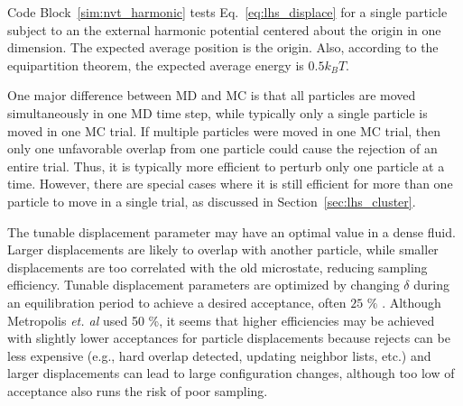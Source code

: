 \documentclass[
  9pt,
  bestpractices,
]{livecoms}
\begin{document}
\begin{figure}

\end{figure}

Code Block~\ref{sim:nvt_harmonic} tests Eq.~\ref{eq:lhs_displace} for a single particle subject to an the external harmonic potential centered about the origin in one dimension.
The expected average position is the origin.
Also, according to the equipartition theorem, the expected average energy is $0.5k_BT$.

One major difference between MD and MC is that all particles are moved simultaneously in one MD time step, while typically only a single particle is moved in one MC trial.
If multiple particles were moved in one MC trial, then only one unfavorable overlap from one particle could cause the rejection of an entire trial.
Thus, it is typically more efficient to perturb only one particle at a time.
However, there are special cases where it is still efficient for more than one particle to move in a single trial, as discussed in Section~\ref{sec:lhs_cluster}.

The tunable displacement parameter may have an optimal value in a dense fluid.
Larger displacements are likely to overlap with another particle, while smaller displacements are too correlated with the old microstate, reducing sampling efficiency.
Tunable displacement parameters are optimized by changing $\delta$ during an equilibration period to achieve a desired acceptance, often $25$ $\%$ \cite{kolafa_optimization_1987, jacucci_comparing_1984, chapman_metropolis_1985, mountain_quantative_1994, hatch_parallel_2020}.
Although Metropolis \textit{et. al} \cite{metropolis_equation_1953} used 50 \%, it seems that higher efficiencies may be achieved with slightly lower acceptances for particle displacements because rejects can be less expensive (e.g., hard overlap detected, updating neighbor lists, etc.) and larger displacements can lead to large configuration changes, although too low of acceptance also runs the risk of poor sampling.
\end{document}
